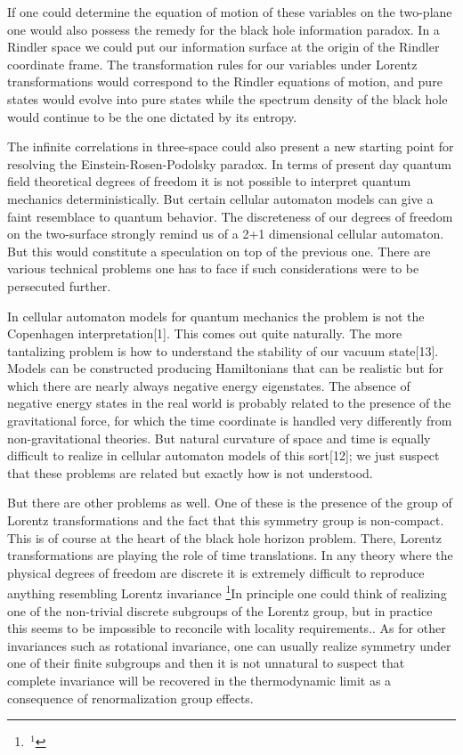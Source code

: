 If one could determine the equation of motion of these variables on the
two-plane one would also possess the remedy for the black hole
information paradox. In a Rindler space we could put our information
surface at the origin of the Rindler coordinate frame. The
transformation rules for our variables under Lorentz transformations
would correspond to the Rindler equations of motion, and pure states
would evolve into pure states while the spectrum density of the black
hole would continue to be the one dictated by its entropy.

The infinite correlations in three-space could also present a new
starting point for resolving the Einstein-Rosen-Podolsky paradox. In
terms of present day quantum field theoretical degrees of freedom it is
not possible to interpret quantum mechanics deterministically. But
certain cellular automaton models can give a faint resemblace to
quantum behavior. The discreteness of our degrees of freedom on the
two-surface strongly remind us of a 2+1 dimensional cellular automaton.
But this would constitute a speculation on top of the previous one.
There are various technical problems one has to face if such
considerations were to be persecuted further.

In cellular automaton models for quantum mechanics the problem is not
the Copenhagen interpretation[1]. This comes out quite naturally. The
more tantalizing problem is how to understand the stability of our
vacuum state[13].  Models can be constructed producing Hamiltonians that
can be realistic but for which there are nearly always negative energy
eigenstates. The absence of negative energy states in the real world is
probably related to the presence of the gravitational force, for which
the time coordinate is handled very differently from non-gravitational
theories. But natural curvature of space and time is equally difficult
to realize in cellular automaton models of this sort[12]; we just suspect
that these problems are related but exactly how is not understood.

But there are other problems as well. One of these is the presence of
the group of Lorentz transformations and the fact that this symmetry
group is non-compact. This is of course at the heart of the black hole
horizon problem.  There, Lorentz transformations are playing the role
of time translations. In any theory where the physical degrees of
freedom are discrete it is extremely difficult to reproduce anything
resembling Lorentz invariance \footnote{$\, ^1$}{\smallrm In principle
one could think of realizing one of the non-trivial discrete subgroups
of the Lorentz group, but in practice this seems to be impossible to
reconcile with locality requirements.}. As for other invariances such
as rotational invariance, one can usually realize symmetry under one of
their finite subgroups and then it is not unnatural to suspect that
complete invariance will be recovered in the thermodynamic limit as a
consequence of renormalization group effects.

